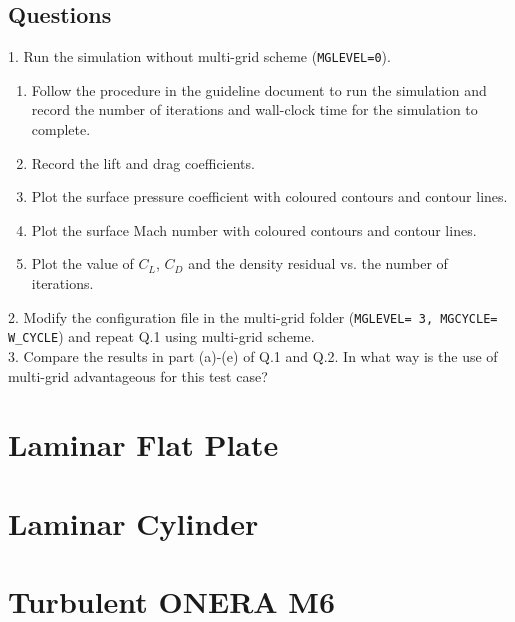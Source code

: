\section{Questions}
1. Run the simulation without multi-grid scheme (\texttt{MGLEVEL=0}).
\begin{enumerate}[label=(\alph*)]
    \item Follow the procedure in the guideline document to run the simulation and record the number of iterations and wall-clock time for the simulation to complete.
    \item Record the lift and drag coefficients.
    \item Plot the surface pressure coefficient with coloured contours and contour lines.
    \item Plot the surface Mach number with coloured contours and contour lines.
    \item Plot the value of $C_L$, $C_D$ and the density residual vs. the number of iterations.
\end{enumerate}
2. Modify the configuration file in the multi-grid folder (\texttt{MGLEVEL= 3, MGCYCLE= W\_CYCLE}) and repeat Q.1 using multi-grid scheme.\\
3. Compare the results in part (a)-(e) of Q.1 and Q.2. In what way is the use of multi-grid advantageous for this test case?\\
\chapter{Laminar Flat Plate}

\chapter{Laminar Cylinder}

\chapter{Turbulent ONERA M6}
